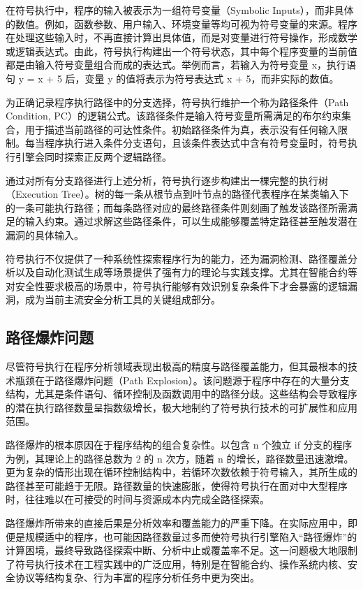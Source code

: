 \documentclass[print, master, vlined, timesmath]{DissertUESTC}
\begin{document}
在符号执行中，程序的输入被表示为一组符号变量（Symbolic Inputs），而非具体的数值。例如，函数参数、用户输入、环境变量等均可视为符号变量的来源。程序在处理这些输入时，不再直接计算出具体值，而是对变量进行符号操作，形成数学或逻辑表达式。由此，符号执行构建出一个符号状态，其中每个程序变量的当前值都是由输入符号变量组合而成的表达式。举例而言，若输入为符号变量 x，执行语句 y = x + 5 后，变量 y 的值将表示为符号表达式 x + 5，而非实际的数值。

为正确记录程序执行路径中的分支选择，符号执行维护一个称为路径条件（Path Condition, PC）的逻辑公式\cite{}。该路径条件是输入符号变量所需满足的布尔约束集合，用于描述当前路径的可达性条件。初始路径条件为真，表示没有任何输入限制。每当程序执行进入条件分支语句，且该条件表达式中含有符号变量时，符号执行引擎会同时探索正反两个逻辑路径。

通过对所有分支路径进行上述分析，符号执行逐步构建出一棵完整的执行树（Execution Tree）\cite{}。树的每一条从根节点到叶节点的路径代表程序在某类输入下的一条可能执行路径；而每条路径对应的最终路径条件则刻画了触发该路径所需满足的输入约束。通过求解这些路径条件，可以生成能够覆盖特定路径甚至触发潜在漏洞的具体输入。

符号执行不仅提供了一种系统性探索程序行为的能力，还为漏洞检测、路径覆盖分析以及自动化测试生成等场景提供了强有力的理论与实践支撑。尤其在智能合约等对安全性要求极高的场景中，符号执行能够有效识别复杂条件下才会暴露的逻辑漏洞，成为当前主流安全分析工具的关键组成部分\cite{}。

\subsection{路径爆炸问题}

尽管符号执行在程序分析领域表现出极高的精度与路径覆盖能力，但其最根本的技术瓶颈在于路径爆炸问题（Path Explosion）\cite{}。该问题源于程序中存在的大量分支结构，尤其是条件语句、循环控制及函数调用中的路径分歧。这些结构会导致程序的潜在执行路径数量呈指数级增长，极大地制约了符号执行技术的可扩展性和应用范围。

路径爆炸的根本原因在于程序结构的组合复杂性。以包含 n 个独立 if 分支的程序为例，其理论上的路径总数为 2 的 n 次方，随着 n 的增长，路径数量迅速激增。更为复杂的情形出现在循环控制结构中，若循环次数依赖于符号输入，其所生成的路径甚至可能趋于无限\cite{}。路径数量的快速膨胀，使得符号执行在面对中大型程序时，往往难以在可接受的时间与资源成本内完成全路径探索。

路径爆炸所带来的直接后果是分析效率和覆盖能力的严重下降。在实际应用中，即便是规模适中的程序，也可能因路径数量过多而使符号执行引擎陷入“路径爆炸”的计算困境，最终导致路径探索中断、分析中止或覆盖率不足。这一问题极大地限制了符号执行技术在工程实践中的广泛应用，特别是在智能合约、操作系统内核、安全协议等结构复杂、行为丰富的程序分析任务中更为突出。
\end{document}
